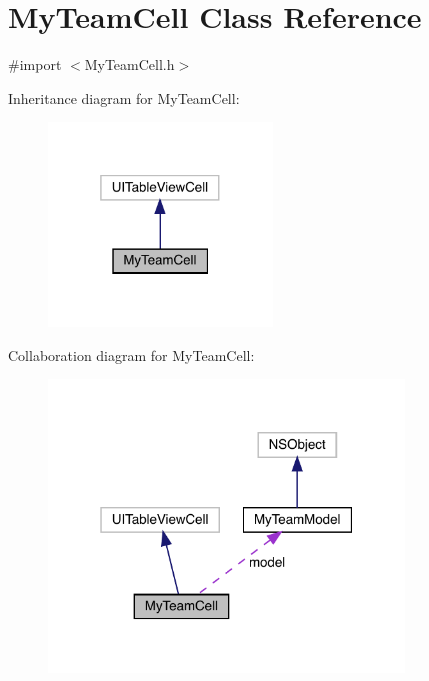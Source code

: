 \hypertarget{interface_my_team_cell}{}\section{My\+Team\+Cell Class Reference}
\label{interface_my_team_cell}


{\ttfamily \#import $<$My\+Team\+Cell.\+h$>$}



Inheritance diagram for My\+Team\+Cell\+:\nopagebreak
\begin{figure}[H]
\begin{center}
\leavevmode
\includegraphics[width=169pt]{interface_my_team_cell__inherit__graph}
\end{center}
\end{figure}


Collaboration diagram for My\+Team\+Cell\+:\nopagebreak
\begin{figure}[H]
\begin{center}
\leavevmode
\includegraphics[width=268pt]{interface_my_team_cell__coll__graph}
\end{center}
\end{figure}
